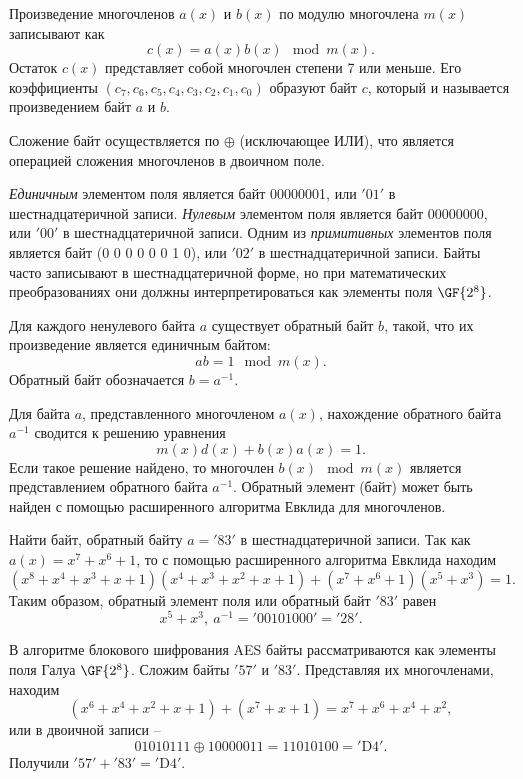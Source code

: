 Произведение многочленов $a(x)$ и $b(x)$  по модулю многочлена $m(x)$  записывают как
    \[ c(x) = a(x) b(x) \mod m(x). \]
Остаток $c(x)$ представляет собой многочлен степени 7 или меньше. Его коэффициенты $(c_{7}, c_{6}, c_{5}, c_{4}, c_{3}, c_{2}, c_{1}, c_{0})$ образуют байт $c$, который и называется произведением байт $a$ и $b$.

Сложение байт осуществляется по $\oplus$ (исключающее ИЛИ), что является операцией сложения многочленов в двоичном поле.

\emph{Единичным} элементом поля является байт 00000001, или $\mathrm{'01'}$ в шестнадцатеричной записи. \emph{Нулевым} элементом поля является байт 00000000, или $\mathrm{'00'}$ в шестнадцатеричной записи. Одним из \emph{примитивных} элементов поля является байт (0 0 0 0 0 0 1 0), или $\mathrm{'02'}$ в шестнадцатеричной записи. Байты часто записывают в шестнадцатеричной форме, но при математических преобразованиях они должны интерпретироваться как элементы поля $\GF{2^8}$.

Для каждого ненулевого байта $a$ существует обратный байт $b$, такой, что их произведение является единичным байтом:
    \[ a b = 1 \mod m(x). \]
Обратный байт обозначается $b = a^{-1}$.

Для байта $a$, представленного многочленом $a(x)$, нахождение обратного байта $a^{-1}$ сводится к решению уравнения
    \[ m(x) d(x) + b(x) a(x) = 1. \]
Если такое решение найдено, то многочлен $b(x) \mod m(x)$ является представлением обратного байта $a^{-1}$. Обратный элемент (байт) может быть найден с помощью расширенного алгоритма Евклида для многочленов.

\example
Найти байт, обратный байту $a = \mathrm{'83'}$ в шестнадцатеричной записи. Так как $a(x) = x^{7} + x^{6} + 1$, то с помощью расширенного алгоритма Евклида находим
    \[ (x^{8} + x^{4} + x^{3} + x + 1) (x^{4} + x^{3} + x^{2} + x + 1) + (x^{7} + x^{6} + 1) (x^{5} + x^{3}) = 1. \]
Таким образом, обратный элемент поля или обратный байт $\mathrm{'83'}$ равен
    \[ x^{5} + x^{3}, ~ a^{-1} = \mathrm{'00101000'} = \mathrm{'28'}. \]
\exampleend

\example
В алгоритме блокового шифрования AES байты рассматриваются как элементы поля Галуа $\GF{2^8}$. Сложим байты $\mathrm{'57'}$ и $\mathrm{'83'}$. Представляя их многочленами, находим
    \[ (x^6 + x^4 + x^2 + x + 1) + (x^7 + x + 1) = x^7 + x^6 + x^4 + x^2, \]
или в двоичной записи --
    \[ 01010111 \oplus 10000011 = 11010100 = \mathrm{'D4'}. \]
Получили $\mathrm{'57'} + \mathrm{'83'} = \mathrm{'D4'}$.
\exampleend

